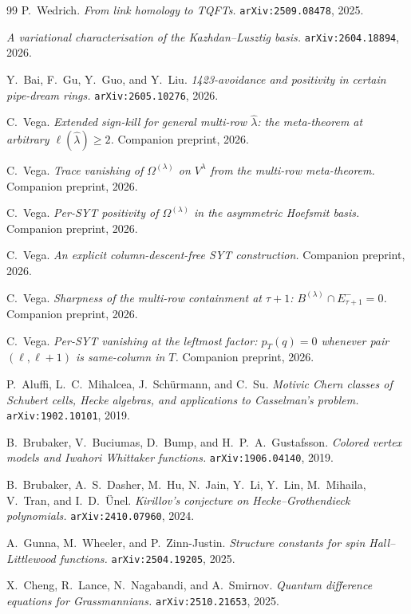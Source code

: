 \documentclass[11pt]{article}
\theoremstyle{definition}
\newcommand{\Vlam}{V^{\lambda}}
\newcommand{\Om}{\Omega}
\newcommand{\bla}{\widehat\lambda}
\newcommand{\elh}{\ell(\bla)}
\begin{document}
\begin{thebibliography}{99}
P.~Wedrich.
\emph{From link homology to TQFTs.}
\texttt{arXiv:2509.08478}, 2025.

\emph{A variational characterisation of the Kazhdan--Lusztig basis.}
\texttt{arXiv:2604.18894}, 2026.

Y.~Bai, F.~Gu, Y.~Guo, and Y.~Liu.
\emph{1423-avoidance and positivity in certain pipe-dream rings.}
\texttt{arXiv:2605.10276}, 2026.

C.~Vega.
\emph{Extended sign-kill for general multi-row $\bla$: the meta-theorem at arbitrary $\elh \ge 2$.}
Companion preprint, 2026.

C.~Vega.
\emph{Trace vanishing of $\Om^{(\lambda)}$ on $\Vlam$ from the multi-row meta-theorem.}
Companion preprint, 2026.

C.~Vega.
\emph{Per-SYT positivity of $\Om^{(\lambda)}$ in the asymmetric Hoefsmit basis.}
Companion preprint, 2026.

C.~Vega.
\emph{An explicit column-descent-free SYT construction.}
Companion preprint, 2026.

C.~Vega.
\emph{Sharpness of the multi-row containment at $\tau+1$: $B^{(\lambda)} \cap E^-_{\tau+1} = 0$.}
Companion preprint, 2026.

C.~Vega.
\emph{Per-SYT vanishing at the leftmost factor: $p_T(q) = 0$ whenever pair $(\ell, \ell+1)$ is same-column in $T$.}
Companion preprint, 2026.

P.~Aluffi, L.~C.~Mihalcea, J.~Sch\"urmann, and C.~Su.
\emph{Motivic Chern classes of Schubert cells, Hecke algebras, and applications to Casselman's problem.}
\texttt{arXiv:1902.10101}, 2019.

B.~Brubaker, V.~Buciumas, D.~Bump, and H.~P.~A.~Gustafsson.
\emph{Colored vertex models and Iwahori Whittaker functions.}
\texttt{arXiv:1906.04140}, 2019.

B.~Brubaker, A.~S.~Dasher, M.~Hu, N.~Jain, Y.~Li, Y.~Lin, M.~Mihaila, V.~Tran, and I.~D.~\"Unel.
\emph{Kirillov's conjecture on Hecke--Grothendieck polynomials.}
\texttt{arXiv:2410.07960}, 2024.

A.~Gunna, M.~Wheeler, and P.~Zinn-Justin.
\emph{Structure constants for spin Hall--Littlewood functions.}
\texttt{arXiv:2504.19205}, 2025.

X.~Cheng, R.~Lance, N.~Nagabandi, and A.~Smirnov.
\emph{Quantum difference equations for Grassmannians.}
\texttt{arXiv:2510.21653}, 2025.

\end{thebibliography}
\end{document}

